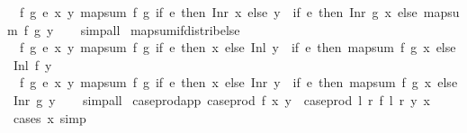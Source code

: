 \begin{isabellebody}
\ \ {\isachardoublequoteopen}{\isasymAnd}f\ g\ e\ x\ y{\isachardot}{\kern0pt}\ map{\isacharunderscore}{\kern0pt}sum\ f\ g\ {\isacharparenleft}{\kern0pt}if\ e\ then\ Inr\ x\ else\ y{\isacharparenright}{\kern0pt}\ {\isacharequal}{\kern0pt}\ {\isacharparenleft}{\kern0pt}if\ e\ then\ Inr\ {\isacharparenleft}{\kern0pt}g\ x{\isacharparenright}{\kern0pt}\ else\ map{\isacharunderscore}{\kern0pt}sum\ f\ g\ y{\isacharparenright}{\kern0pt}{\isachardoublequoteclose}\isanewline
%
\isadelimproof
\ \ %
\endisadelimproof
%
\isatagproof
{}\isamarkupfalse%
\ simp{\isacharunderscore}{\kern0pt}all%
\endisatagproof
{\isafoldproof}%
%
\isadelimproof
\isanewline
%
\endisadelimproof
\isanewline
{}\isamarkupfalse%
\ map{\isacharunderscore}{\kern0pt}sum{\isacharunderscore}{\kern0pt}if{\isacharunderscore}{\kern0pt}distrib{\isacharunderscore}{\kern0pt}else{\isacharcolon}{\kern0pt}\isanewline
\ \ {\isachardoublequoteopen}{\isasymAnd}f\ g\ e\ x\ y{\isachardot}{\kern0pt}\ map{\isacharunderscore}{\kern0pt}sum\ f\ g\ {\isacharparenleft}{\kern0pt}if\ e\ then\ x\ else\ Inl\ y{\isacharparenright}{\kern0pt}\ {\isacharequal}{\kern0pt}\ {\isacharparenleft}{\kern0pt}if\ e\ then\ map{\isacharunderscore}{\kern0pt}sum\ f\ g\ x\ else\ Inl\ {\isacharparenleft}{\kern0pt}f\ y{\isacharparenright}{\kern0pt}{\isacharparenright}{\kern0pt}{\isachardoublequoteclose}\isanewline
\ \ {\isachardoublequoteopen}{\isasymAnd}f\ g\ e\ x\ y{\isachardot}{\kern0pt}\ map{\isacharunderscore}{\kern0pt}sum\ f\ g\ {\isacharparenleft}{\kern0pt}if\ e\ then\ x\ else\ Inr\ y{\isacharparenright}{\kern0pt}\ {\isacharequal}{\kern0pt}\ {\isacharparenleft}{\kern0pt}if\ e\ then\ map{\isacharunderscore}{\kern0pt}sum\ f\ g\ x\ else\ Inr\ {\isacharparenleft}{\kern0pt}g\ y{\isacharparenright}{\kern0pt}{\isacharparenright}{\kern0pt}{\isachardoublequoteclose}\isanewline
%
\isadelimproof
\ \ %
\endisadelimproof
%
\isatagproof
{}\isamarkupfalse%
\ simp{\isacharunderscore}{\kern0pt}all%
\endisatagproof
{\isafoldproof}%
%
\isadelimproof
\isanewline
%
\endisadelimproof
\isanewline
{}\isamarkupfalse%
\ case{\isacharunderscore}{\kern0pt}prod{\isacharunderscore}{\kern0pt}app{\isacharcolon}{\kern0pt}\ {\isachardoublequoteopen}case{\isacharunderscore}{\kern0pt}prod\ f\ x\ y\ {\isacharequal}{\kern0pt}\ case{\isacharunderscore}{\kern0pt}prod\ {\isacharparenleft}{\kern0pt}{\isasymlambda}l\ r{\isachardot}{\kern0pt}\ f\ l\ r\ y{\isacharparenright}{\kern0pt}\ x{\isachardoublequoteclose}\isanewline
%
\isadelimproof
\ \ %
\endisadelimproof
%
\isatagproof
{}\isamarkupfalse%
\ {\isacharparenleft}{\kern0pt}cases\ x{\isacharparenright}{\kern0pt}\ simp%

\end{isabellebody}
